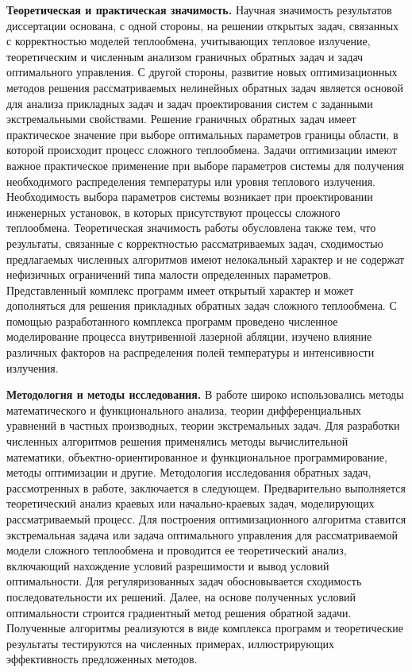 \textbf{Теоретическая и практическая значимость.}
Научная значимость результатов диссертации основана, с одной
стороны, на решении открытых задач, связанных с корректностью моделей
теплообмена, учитывающих тепловое излучение, теоретическим и
численным анализом граничных обратных задач и задач оптимального
управления.
С другой стороны, развитие новых оптимизационных методов
решения рассматриваемых нелинейных обратных задач является основой для
анализа прикладных задач и задач проектирования систем с заданными
экстремальными свойствами.
Решение граничных обратных задач имеет практическое значение при
выборе оптимальных параметров границы области, в которой происходит
процесс сложного теплообмена.
Задачи оптимизации имеют важное
практическое применение при выборе параметров системы для получения
необходимого распределения температуры или уровня теплового излучения.
Необходимость выбора параметров системы возникает при проектировании
инженерных установок, в которых присутствуют процессы сложного
теплообмена.
Теоретическая значимость работы обусловлена также тем, что
результаты, связанные с корректностью рассматриваемых задач,
сходимостью предлагаемых численных алгоритмов имеют нелокальный
характер и не содержат нефизичных ограничений типа малости
определенных параметров.
Представленный комплекс программ имеет открытый характер и может
дополняться для решения прикладных обратных задач сложного
теплообмена.
С помощью разработанного комплекса программ проведено численное
моделирование процесса внутривенной лазерной абляции, изучено влияние
различных факторов на распределения полей температуры и интенсивности
излучения.


\textbf{Методология и методы исследования.}
 В работе широко использовались методы математического и функционального анализа,
 теории дифференциальных уравнений в частных производных, теории экстремальных задач.
Для разработки численных алгоритмов решения применялись методы
вычислительной математики, объектно-ориентированное и функциональное
программирование, методы оптимизации и другие.
Методология исследования обратных задач, рассмотренных в работе,
заключается в следующем.
Предварительно выполняется теоретический анализ краевых или начально-краевых задач, моделирующих
рассматриваемый процесс.
Для построения оптимизационного алгоритма ставится экстремальная задача или задача
оптимального управления для рассматриваемой модели сложного теплообмена и проводится ее
теоретический анализ, включающий нахождение условий разрешимости и
вывод условий оптимальности.
Для регуляризованных задач обосновывается
сходимость последовательности их решений.
 Далее, на основе полученных условий оптимальности
 строится градиентный метод решения обратной задачи.
Полученные алгоритмы реализуются в виде комплекса программ и
теоретические результаты тестируются на численных примерах,
иллюстрирующих эффективность предложенных методов.


